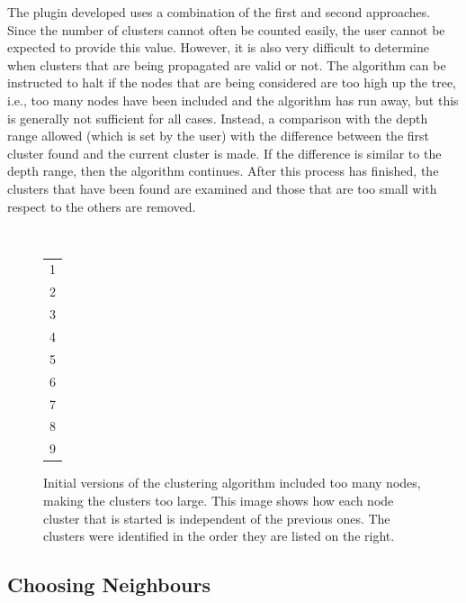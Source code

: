 The plugin developed uses a combination of the first and second approaches.
Since the number of clusters cannot often be counted easily, the user cannot be
expected to provide this value. However, it is also very difficult to determine
when clusters that are being propagated are valid or not. The algorithm can be
instructed to halt if the nodes that are being considered are too high up the
tree, i.e., too many nodes have been included and the algorithm has run away,
but this is generally not sufficient for all cases. Instead, a comparison with
the depth range allowed (which is set by the user) with the difference between
the first cluster found and the current cluster is made. If the difference is
similar to the depth range, then the algorithm continues. After this process
has finished, the clusters that have been found are examined and those that are
too small with respect to the others are removed.

\begin{figure}[tbh]
	\centering
	\begin{minipage}[c]{7cm}
	\end{minipage}%
	\,
	\begin{minipage}[c]{1cm}
		\centering
		\begin{tabular}[b]{l}
			\cellcolor{lyellow}1 \\
			\cellcolor{lorange}2 \\
			\cellcolor{lbrown}3 \\
			\cellcolor{lgreen}4 \\
			\cellcolor{lblue}5 \\
			\cellcolor{lpurple}6 \\
			\cellcolor{lred}7 \\
			\cellcolor{silver}8 \\
			\cellcolor{lgrey}9 \\
		\end{tabular}
	\end{minipage}

	\caption[Propagation of multiple starting locations.]{Initial versions of
		the clustering algorithm included too many nodes, making the clusters
		too large. This image shows how each node cluster that is started is
		independent of the previous ones. The clusters were identified in the
		order they are listed on the right.}\label{fig:multiple-clusters-colours}
\end{figure}

\subsection{Choosing Neighbours}
\label{sub:choosing_neighbours}

